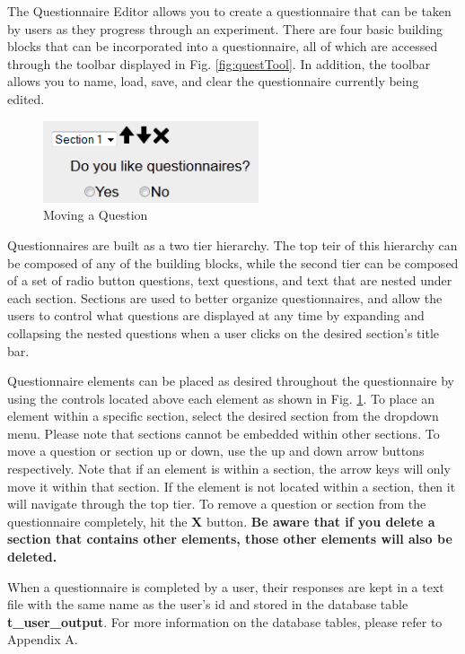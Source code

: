 \documentclass[article]{ij4uq}              %
\begin{document}
The Questionnaire Editor allows you to create a questionnaire that can be taken by users as they progress through an experiment. There are four basic building blocks that can be incorporated into a questionnaire, all of which are accessed through the toolbar displayed in Fig. \ref{fig:questTool}. In addition, the toolbar allows you to name, load, save, and clear the questionnaire currently being edited.

\begin{figure}[h!]
 \centering
 \includegraphics[width=2.5in]{figures/question_edit.png}
 \caption{Moving a Question}
 \label{fig:questEdit}
\end{figure}
\FloatBarrier

Questionnaires are built as a two tier hierarchy.  The top teir of this hierarchy can be composed of any of the building blocks, while the second tier can be composed of a set of radio button questions, text questions, and text that are nested under each section.  Sections are used to better organize questionnaires, and allow the users to control what questions are displayed at any time by expanding and collapsing the nested questions when a user clicks on the desired section's title bar.  

Questionnaire elements can be placed as desired throughout the questionnaire by using the controls located above each element as shown in Fig. \ref{fig:questEdit}.  To place an element within a specific section, select the desired section from the dropdown menu.  Please note that sections cannot be embedded within other sections.  To move a question or section up or down, use the up and down arrow buttons respectively.  Note that if an element is within a section, the arrow keys will only move it within that section. If the element is not located within a section, then it will navigate through the top tier.  To remove a question or section from the questionnaire completely, hit the \textbf{X} button.  \textbf{Be aware that if you delete a section that contains other elements, those other elements will also be deleted.}

When a questionnaire is completed by a user, their responses are kept in a text file with the same name as the user's id and stored in the database table \textbf{t_user_output}. For more information on the database tables, please refer to Appendix A.
\end{document}
